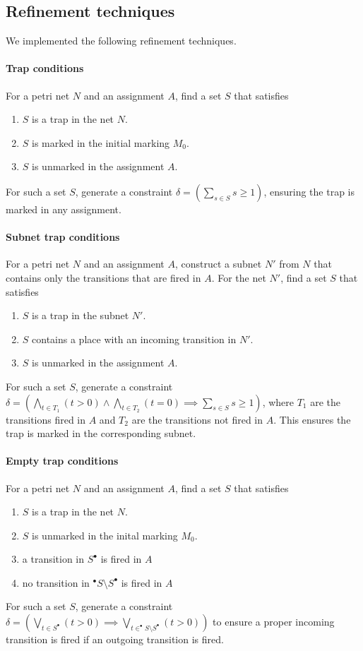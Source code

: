 \documentclass{article}
\begin{document}
\subsection{Refinement techniques}

We implemented the following refinement techniques.

\paragraph{Trap conditions} For a petri net $N$ and an assignment $A$,
find a set $S$ that satisfies
\begin{enumerate}
  \item $S$ is a trap in the net $N$.
  \item $S$ is marked in the initial marking $M_0$.
  \item $S$ is unmarked in the assignment $A$.
\end{enumerate}
For such a set $S$, generate a constraint
$\delta = \left( \sum_{s \in S} s \ge 1 \right)$, ensuring the
trap is marked in any assignment.

\paragraph{Subnet trap conditions} For a petri net $N$ and an assignment $A$,
construct a subnet $N'$ from $N$ that contains only
the transitions that are fired in $A$.
For the net $N'$, find a set $S$ that satisfies
\begin{enumerate}
  \item $S$ is a trap in the subnet $N'$.
  \item $S$ contains a place with an incoming transition in $N'$.
  \item $S$ is unmarked in the assignment $A$.
\end{enumerate}
For such a set $S$, generate a constraint
$\delta = \left( \bigwedge_{t \in T_1} (t > 0) \land
\bigwedge_{t \in T_2} (t = 0) \implies \sum_{s \in S} s \ge 1 \right)$,
where $T_1$ are the transitions fired in $A$ and $T_2$ are the
transitions not fired in $A$. This ensures the trap is marked in the
corresponding subnet.

\paragraph{Empty trap conditions} For a petri net $N$ and an assignment $A$,
find a set $S$ that satisfies
\begin{enumerate}
  \item $S$ is a trap in the net $N$.
  \item $S$ is unmarked in the inital marking $M_0$.
  \item a transition in $S^\bullet$ is fired in $A$
  \item no transition in $^\bullet S \setminus S^\bullet$ is fired in $A$
\end{enumerate}
For such a set $S$, generate a constraint
$\delta = \left( \bigvee_{t \in S^\bullet} (t > 0) \implies
\bigvee_{t \in ^\bullet S \setminus S^\bullet} (t > 0) \right)$
to ensure a proper incoming transition
is fired if an outgoing transition is fired.
\end{document}
